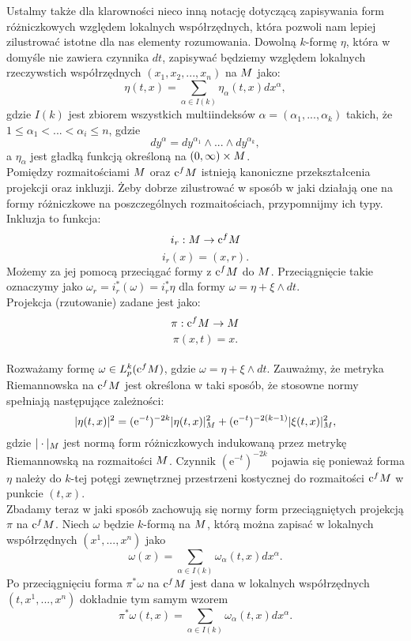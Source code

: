 \documentclass[licencjacka]{pracamgr}
\theoremstyle{definition}
\theoremstyle{definition}
\theoremstyle{plain}
\theoremstyle{plain}
\theoremstyle{plain}
\theoremstyle{plain}
\def\cfm{\ensuremath\mathrm{c}^fM}
\def\M{\ensuremath M}
\begin{document}
Ustalmy także dla klarowności nieco inną notację dotyczącą zapisywania
form różniczkowych względem lokalnych współrzędnych, która pozwoli nam 
lepiej zilustrować istotne dla nas elementy rozumowania. Dowolną $k$-formę $\eta$,
która w domyśle nie zawiera czynnika $dt$, zapisywać będziemy względem
lokalnych rzeczywstich współrzędnych
$(x_1, x_2, ... , x_n)$ na $\M$ jako:
\[
    \eta(t, x) = \sum_{\alpha \in I(k)} \eta_\alpha (t, x) dx^\alpha,
\]
gdzie $I(k)$ jest zbiorem wszystkich multiindeksów $\alpha = (\alpha_1, ...,
\alpha_k)$ takich, że $1 \leq \alpha_1 < ... < \alpha_i \leq n$, gdzie
\begin{equation}\label{notacja}
    dy^\alpha = dy^{\alpha_1} \wedge ... \wedge dy^{\alpha_k},
\end{equation}
a $\eta_\alpha$ jest gładką funkcją określoną na $(0, \infty) \times \M$. \\

Pomiędzy rozmaitościami $\M$ oraz $\cfm$ istnieją kanoniczne przekształcenia
projekcji oraz inkluzji. Żeby dobrze zilustrować w sposób w jaki działają one
na formy różniczkowe na poszczególnych rozmaitościach, przypomnijmy ich typy.
Inkluzja to funkcja:
\[
    i_r: \M \rightarrow \cfm \\
\]
\[
    i_r(x) = (x, r).
\]
Możemy za jej pomocą przeciągać formy z $\cfm$ do $\M$. Przeciągnięcie takie
oznaczymy jako $\omega_r = i_r^\ast(\omega) = i_r^\ast \eta $ dla formy $\omega
= \eta + \xi \wedge dt$. \\
Projekcja (rzutowanie) zadane jest jako:
\[
    \pi: \cfm \rightarrow \M
\]
\[
    \pi (x, t) = x.
\] \\


Rozważamy formę $\omega \in L^k_p (\cfm)$, gdzie
$\omega = \eta + \xi \wedge dt$.
Zauważmy, że metryka Riemannowska na $\cfm$ jest określona w taki sposób, że
stosowne normy spełniają następujące zależności:
$$
| \eta(t,x) |^2 = (\mathrm{e}^{-t})^{-2k} | \eta(t,x) |^2_{\M} +
(\mathrm{e}^{-t})^{-2(k-1)} | \xi(t,x) |^2_{\M},
$$
gdzie $|\cdot |_{\M} $ jest normą form różniczkowych indukowaną przez
metrykę Riemannowską na rozmaitości $\M$.  Czynnik $(\mathrm{e}^{-t})^{-2k}$
pojawia się ponieważ forma $\eta$ należy do $k$-tej potęgi zewnętrznej
przestrzeni kostycznej do rozmaitości $\cfm$ w punkcie $(t,x)$.  \\


Zbadamy teraz w jaki sposób zachowują się normy form przeciągniętych 
projekcją $\pi$ na $\cfm$.
Niech $\omega$ będzie $k$-formą na $\M$, którą można zapisać w lokalnych
współrzędnych $(x^1, ..., x^n)$ jako
\[
\omega(x) = \sum_{\alpha \in I(k)} \omega_\alpha (t, x) dx^\alpha.
\]
Po przeciągnięciu forma $\pi^\ast \omega$ na $\cfm$ jest dana w lokalnych 
współrzędnych $(t, x^1, ..., x^n)$ dokładnie tym samym wzorem
\[
\pi^\ast \omega(t,x) = \sum_{\alpha \in I(k)} \omega_\alpha (t, x) dx^\alpha.
\]
\end{document}
